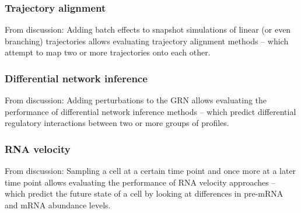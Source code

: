 \subsubsection{Trajectory alignment}
From discussion: Adding batch effects to snapshot simulations of linear (or even branching) trajectories allows evaluating trajectory alignment methods -- which attempt to map two or more trajectories onto each other. 
\subsubsection{Differential network inference}
From discussion: Adding perturbations to the GRN allows evaluating the performance of differential network inference methods -- which predict differential regulatory interactions between two or more groups of profiles.
\subsubsection{RNA velocity}
From discussion: Sampling a cell at a certain time point and once more at a later time point allows evaluating the performance of RNA velocity approaches -- which predict the future state of a cell by looking at differences in pre-mRNA and mRNA abundance levels.








